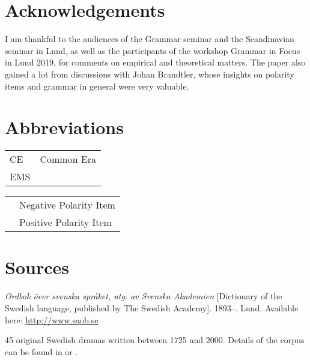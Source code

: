 \documentclass[output=paper]{langscibook}
\begin{document}
\section*{Acknowledgements}


I am thankful to the audiences of the Grammar seminar and the Scandinavian seminar in Lund, as well as the participants of the workshop Grammar in Focus in Lund 2019, for comments on empirical and theoretical matters. The paper also gained a lot from discussions with Johan Brandtler, whose insights on polarity items and grammar in general were very valuable.


\section*{Abbreviations}
\begin{tabularx}{.5\textwidth}{@{}lQ}
CE  &  Common Era                    \\
EMS  &           \\
\end{tabularx}\begin{tabularx}{.5\textwidth}{lQ@{}}
 &   Negative Polarity Item      \\
 &   Positive Polarity Item      \\
\end{tabularx}

\section*{Sources}
\begin{description}[font=\normalfont]
\item[\isi{SAOB}:] \textit{Ordbok över svenska språket, utg. av Svenska Akademien} [Dictionary of the Swedish language, published by The Swedish Academy]. 1893–. Lund. Available here: \url{http://www.saob.se}
\item[The corpus of Swedish drama dialogue.] 45 original Swedish dramas written between 1725 and 2000. Details of the corpus can be found in \citealt{MarttalaStromquist2001} or \citealt{Stroh-Wollin2008}.
\end{description}



{\sloppy\printbibliography[heading=subbibliography,notkeyword=this]}
\end{document}
